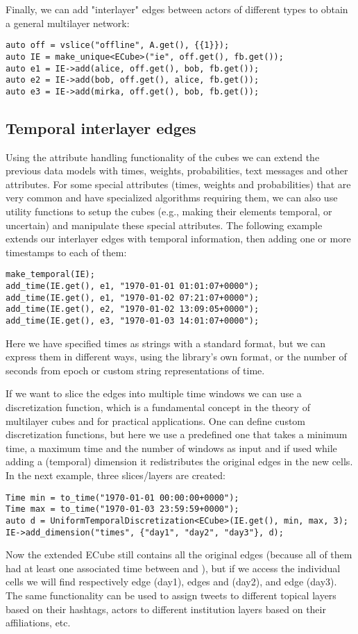 Finally, we can add "interlayer" edges between actors of different types to obtain a general multilayer network:
\begin{lstlisting}[style=c++]
auto off = vslice("offline", A.get(), {{1}});
auto IE = make_unique<ECube>("ie", off.get(), fb.get());
auto e1 = IE->add(alice, off.get(), bob, fb.get());
auto e2 = IE->add(bob, off.get(), alice, fb.get());
auto e3 = IE->add(mirka, off.get(), bob, fb.get());
\end{lstlisting}


\subsection{Temporal interlayer edges}
\label{sec:discr}

Using the attribute handling functionality of the cubes we can extend the previous data models with times, weights, probabilities, text messages and other attributes. For some special attributes (times, weights and probabilities) that are very common and have specialized algorithms requiring them, we can also use utility functions to setup the cubes (e.g., making their elements temporal, or uncertain) and manipulate these special attributes. The following example extends our interlayer edges with temporal information, then adding one or more timestamps to each of them:
\begin{lstlisting}[style=c++]
make_temporal(IE);
add_time(IE.get(), e1, "1970-01-01 01:01:07+0000");
add_time(IE.get(), e1, "1970-01-02 07:21:07+0000");
add_time(IE.get(), e2, "1970-01-02 13:09:05+0000");
add_time(IE.get(), e3, "1970-01-03 14:01:07+0000");
\end{lstlisting}
Here we have specified times as strings with a standard format, but we can express them in different ways, using the library's own  format, or the number of seconds from epoch or custom string representations of time.

If we want to slice the edges into multiple time windows we can use a discretization function, which is a fundamental concept in the theory of multilayer cubes and for practical applications. One can define custom discretization functions, but here we use a predefined one that takes a minimum time, a maximum time and the number of windows as input and if used while adding a (temporal) dimension it redistributes the original edges in the new cells. In the next example, three slices/layers are created:
\begin{lstlisting}[style=c++]
Time min = to_time("1970-01-01 00:00:00+0000");
Time max = to_time("1970-01-03 23:59:59+0000");
auto d = UniformTemporalDiscretization<ECube>(IE.get(), min, max, 3);
IE->add_dimension("times", {"day1", "day2", "day3"}, d);
\end{lstlisting}
Now the extended ECube  still contains all the original edges (because all of them had at least one associated time between  and ), but if we access the individual cells we will find respectively edge  (day1), edges  and  (day2), and edge  (day3). The same functionality can be used to assign tweets to different topical layers based on their hashtags, actors to different institution layers based on their affiliations, etc.
